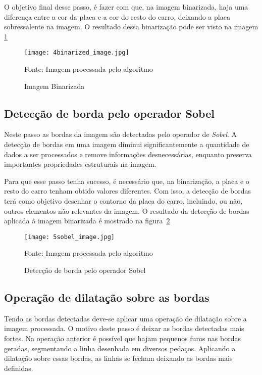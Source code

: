 O objetivo final desse passo, é fazer com que, na imagem binarizada, haja uma diferença entre a cor da placa e a cor do resto do carro, deixando a placa sobressalente na imagem. O resultado dessa binarização pode ser visto na imagem \ref{fig:ext_binarized_image}

\begin{figure}[H]
	\centering
	\texttt{[image: 4binarized\_image.jpg]}
	\caption{Imagem Binarizada}
Fonte: Imagem processada pelo algoritmo
	\label{fig:ext_binarized_image}
\end{figure}

\subsection{Detecção de borda pelo operador Sobel}
\label{sec:detec_bordas}

Neste passo as bordas da imagem são detectadas pelo operador de \emph{Sobel}. A detecção de bordas em uma imagem diminui significantemente a quantidade de dados a ser processados e remove informações desnecessárias, enquanto preserva importantes propriedades estruturais na imagem.\cite{ha2016license}

Para que esse passo tenha sucesso, é necessário que, na binarização, a placa e o resto do carro tenham obtido valores diferentes. Com isso, a detecção de bordas terá como objetivo desenhar o contorno da placa do carro, incluindo, ou não, outros elementos não relevantes da imagem. O resultado da detecção de bordas aplicada à imagem binarizada é mostrado na figura~\ref{fig:ext_edge_detection_sobel}

\begin{figure}[H]
	\centering
	\texttt{[image: 5sobel\_image.jpg]}
	\caption{Detecção de borda pelo operador Sobel}
Fonte: Imagem processada pelo algoritmo
	\label{fig:ext_edge_detection_sobel}
\end{figure}

\subsection{Operação de dilatação sobre as bordas}

Tendo as bordas detectadas deve-se aplicar uma operação de dilatação sobre a imagem processada. O motivo deste passo é deixar as bordas detectadas mais fortes. Na operação anterior é possível que hajam pequenos furos nas bordas geradas, segmentando a linha desenhada em diversos pedaços. Aplicando a dilatação sobre essas bordas, as linhas se fecham deixando as bordas mais definidas.


